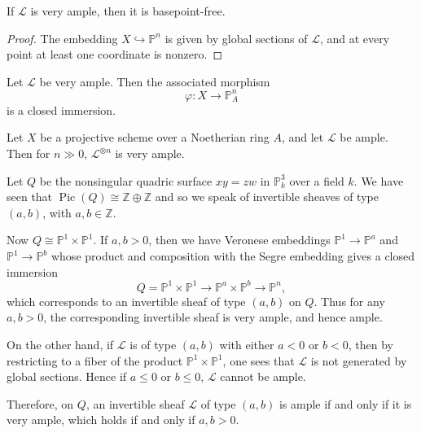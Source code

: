 \documentclass[12pt]{article}
\begin{document}
\begin{proposition}
    If $\mathcal L$ is very ample, then it is basepoint-free.
\end{proposition}

\begin{proof}
    The embedding $X \hookrightarrow \mathbb P^n$ is given by global sections of $\mathcal L$, and at every point at least one coordinate is nonzero.
\end{proof}

\begin{proposition}
    Let $\mathcal L$ be very ample. Then the associated morphism
    \[
        \varphi : X \to \mathbb P^n_A
    \]
    is a closed immersion.
\end{proposition}



\begin{theorem}[Serre]
    Let $X$ be a projective scheme over a Noetherian ring $A$, and let $\mathcal L$ be ample. Then for $n \gg 0$, $\mathcal L^{\otimes n}$ is very ample.
\end{theorem}

\begin{example}
    Let $Q$ be the nonsingular quadric surface $xy = zw$ in $\mathbb{P}^3_k$ over a field $k$. We have seen that $\operatorname{Pic}(Q) \cong \mathbb{Z} \oplus \mathbb{Z}$
    and so we speak of invertible sheaves of type $(a,b)$, with $a,b \in \mathbb{Z}$.

    Now $Q \cong \mathbb{P}^1 \times \mathbb{P}^1$. If $a,b > 0$, then we have Veronese embeddings $\mathbb{P}^1 \longrightarrow \mathbb{P}^{a}$ and $\mathbb{P}^1 \longrightarrow \mathbb{P}^{b}$ whose product and composition with the Segre embedding gives a closed immersion
    \[
        Q = \mathbb{P}^1 \times \mathbb{P}^1 \longrightarrow \mathbb{P}^{a} \times \mathbb{P}^{b} \longrightarrow \mathbb{P}^n,
    \]
    which corresponds to an invertible sheaf of type $(a,b)$ on $Q$. Thus for any $a,b > 0$, the corresponding invertible sheaf is very ample, and hence ample.

    On the other hand, if $\mathcal{L}$ is of type $(a,b)$ with either $a < 0$ or $b < 0$, then by restricting to a fiber of the product $\mathbb{P}^1 \times \mathbb{P}^1$, one sees that $\mathcal{L}$ is not generated by global sections. Hence if $a \le 0$ or $b \le 0$, $\mathcal{L}$ cannot be ample.

    Therefore, on $Q$, an invertible sheaf $\mathcal{L}$ of type $(a,b)$ is ample if and only if it is very ample, which holds if and only if $a,b > 0$.
\end{example}
\end{document}
